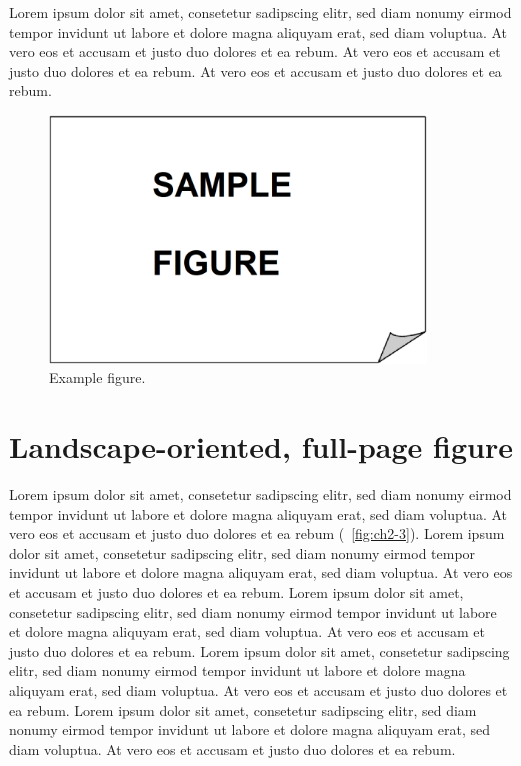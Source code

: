 Lorem ipsum dolor sit amet, consetetur sadipscing elitr, sed diam nonumy eirmod tempor invidunt ut labore et dolore magna aliquyam erat, sed diam voluptua. At vero eos et accusam et justo duo dolores et ea rebum. At vero eos et accusam et justo duo dolores et ea rebum. At vero eos et accusam et justo duo dolores et ea rebum.

\vspace{6pt} %
\begin{figure}[!ht]
    \centering
    \includegraphics[width=10cm,keepaspectratio=true]{./fig/sekil2.png}
    \caption{Example figure.}
    \label{fig:ch2-2}
\end{figure}
\vspace{-9pt} %

\section{Landscape-oriented, full-page figure}

Lorem ipsum dolor sit amet, consetetur sadipscing elitr, sed diam nonumy eirmod tempor invidunt ut labore et dolore magna aliquyam erat, sed diam voluptua. At vero eos et accusam et justo duo dolores et ea rebum (\figurename\ \ref{fig:ch2-3}). Lorem ipsum dolor sit amet, consetetur sadipscing elitr, sed diam nonumy eirmod tempor invidunt ut labore et dolore magna aliquyam erat, sed diam voluptua. At vero eos et accusam et justo duo dolores et ea rebum. 
Lorem ipsum dolor sit amet, consetetur sadipscing elitr, sed diam nonumy eirmod tempor invidunt ut labore et dolore magna aliquyam erat, sed diam voluptua. At vero eos et accusam et justo duo dolores et ea rebum. Lorem ipsum dolor sit amet, consetetur sadipscing elitr, sed diam nonumy eirmod tempor invidunt ut labore et dolore magna aliquyam erat, sed diam voluptua. At vero eos et accusam et justo duo dolores et ea rebum. Lorem ipsum dolor sit amet, consetetur sadipscing elitr, sed diam nonumy eirmod tempor invidunt ut labore et dolore magna aliquyam erat, sed diam voluptua. At vero eos et accusam et justo duo dolores et ea rebum.   

